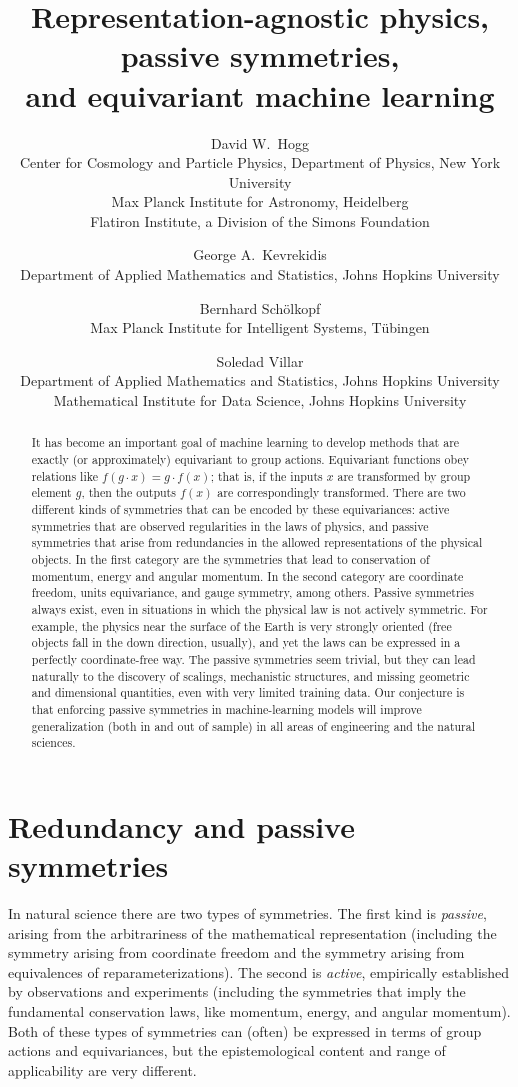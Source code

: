 \documentclass[11pt]{article}
\title{\bfseries%
Representation-agnostic physics, passive symmetries,\\ and equivariant machine learning}
\author{%
  David W.~Hogg\\
{\footnotesize Center for Cosmology and Particle Physics, Department of Physics, New York University}\\[-0.5ex]
{\footnotesize Max Planck Institute for Astronomy, Heidelberg}\\[-0.5ex]
{\footnotesize Flatiron Institute, a Division of the Simons Foundation}
  \and
  George A.~Kevrekidis\\
{\footnotesize Department of Applied Mathematics and Statistics, Johns Hopkins University}
  \and
  Bernhard Sch\"olkopf\\
{\footnotesize Max Planck Institute for Intelligent Systems, T\"ubingen}
  \and
  Soledad Villar\\
{\footnotesize Department of Applied Mathematics and Statistics, Johns Hopkins University}\\[-0.5ex]
{\footnotesize Mathematical Institute for Data Science, Johns Hopkins University}
}
\date{}
\begin{document}
\maketitle

\begin{abstract}\noindent
It has become an important goal of machine learning to develop methods that are exactly (or approximately) equivariant to group actions.
Equivariant functions obey relations like $f(g\cdot x) = g\cdot f(x)$; that is, if the inputs $x$ are transformed by group element $g$, then the outputs $f(x)$ are correspondingly transformed.
There are two different kinds of symmetries that can be encoded by these equivariances: active symmetries that are observed regularities in the laws of physics, and passive symmetries that arise from redundancies in the allowed representations of the physical objects. 
In the first category are the symmetries that lead to conservation of momentum, energy and angular momentum. In the second category are coordinate freedom, units equivariance, and gauge symmetry, among others.  
Passive symmetries always exist, even in situations in which the physical law is not actively symmetric.
For example, the physics near the surface of the Earth is very strongly oriented (free objects fall in the down direction, usually), and yet the laws can be expressed in a perfectly coordinate-free way.
The passive symmetries seem trivial, but they can lead naturally to the discovery of scalings, mechanistic structures, and missing geometric and dimensional quantities, even with very limited training data.
Our conjecture is that enforcing passive symmetries in machine-learning models will improve generalization (both in and out of sample) in all areas of engineering and the natural sciences.
\end{abstract}

\section{Redundancy and passive symmetries}

In natural science there are two types of symmetries. 
The first kind is \emph{passive}, arising from the arbitrariness of the mathematical representation (including the symmetry arising from coordinate freedom and the symmetry arising from equivalences of reparameterizations).
The second is \emph{active}, empirically established by observations and experiments (including the symmetries that imply the fundamental conservation laws, like momentum, energy, and angular momentum). Both of these types of symmetries can (often) be expressed in terms of group actions and equivariances, but the epistemological content and range of applicability are very different. 
\end{document}
